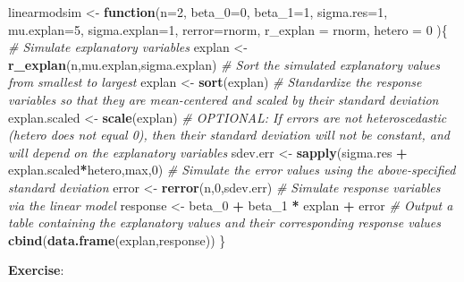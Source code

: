 \documentclass[
]{book}
\newenvironment{Shaded}{\begin{snugshade}}{\end{snugshade}}
\newcommand{\CommentTok}[1]{\textcolor[rgb]{0.56,0.35,0.01}{\textit{#1}}}
\newcommand{\ControlFlowTok}[1]{\textcolor[rgb]{0.13,0.29,0.53}{\textbf{#1}}}
\newcommand{\DataTypeTok}[1]{\textcolor[rgb]{0.13,0.29,0.53}{#1}}
\newcommand{\DecValTok}[1]{\textcolor[rgb]{0.00,0.00,0.81}{#1}}
\newcommand{\KeywordTok}[1]{\textcolor[rgb]{0.13,0.29,0.53}{\textbf{#1}}}
\newcommand{\NormalTok}[1]{#1}
\newcommand{\OperatorTok}[1]{\textcolor[rgb]{0.81,0.36,0.00}{\textbf{#1}}}
\newcommand{\StringTok}[1]{\textcolor[rgb]{0.31,0.60,0.02}{#1}}
\begin{document}
\begin{Shaded}
\begin{Highlighting}[]
\NormalTok{linearmodsim \textless{}{-}}\StringTok{ }\ControlFlowTok{function}\NormalTok{(}\DataTypeTok{n=}\DecValTok{2}\NormalTok{, }\DataTypeTok{beta\_0=}\DecValTok{0}\NormalTok{, }\DataTypeTok{beta\_1=}\DecValTok{1}\NormalTok{, }\DataTypeTok{sigma.res=}\DecValTok{1}\NormalTok{, }\DataTypeTok{mu.explan=}\DecValTok{5}\NormalTok{, }\DataTypeTok{sigma.explan=}\DecValTok{1}\NormalTok{, }\DataTypeTok{rerror=}\NormalTok{rnorm, }\DataTypeTok{r\_explan =}\NormalTok{ rnorm, }\DataTypeTok{hetero =} \DecValTok{0}\NormalTok{ )\{}
  \CommentTok{\# Simulate explanatory variables}
\NormalTok{  explan \textless{}{-}}\StringTok{ }\KeywordTok{r\_explan}\NormalTok{(n,mu.explan,sigma.explan)}
  \CommentTok{\# Sort the simulated explanatory values from smallest to largest}
\NormalTok{  explan \textless{}{-}}\StringTok{ }\KeywordTok{sort}\NormalTok{(explan)}
  \CommentTok{\# Standardize the response variables so that they are  mean{-}centered and scaled by their standard deviation}
\NormalTok{  explan.scaled \textless{}{-}}\StringTok{ }\KeywordTok{scale}\NormalTok{(explan)}
  \CommentTok{\# OPTIONAL: If errors are not heteroscedastic (hetero does not equal 0), then their standard deviation will not be constant, and will depend on the explanatory variables }
\NormalTok{  sdev.err \textless{}{-}}\StringTok{ }\KeywordTok{sapply}\NormalTok{(sigma.res }\OperatorTok{+}\StringTok{ }\NormalTok{explan.scaled}\OperatorTok{*}\NormalTok{hetero,max,}\DecValTok{0}\NormalTok{)}
  \CommentTok{\# Simulate the error values using the above{-}specified standard deviation}
\NormalTok{  error \textless{}{-}}\StringTok{ }\KeywordTok{rerror}\NormalTok{(n,}\DecValTok{0}\NormalTok{,sdev.err)}
  \CommentTok{\# Simulate response variables via the linear model}
\NormalTok{  response \textless{}{-}}\StringTok{ }\NormalTok{beta\_}\DecValTok{0} \OperatorTok{+}\StringTok{ }\NormalTok{beta\_}\DecValTok{1} \OperatorTok{*}\StringTok{ }\NormalTok{explan }\OperatorTok{+}\StringTok{ }\NormalTok{error}
  \CommentTok{\# Output a table containing the explanatory values and their corresponding response values}
  \KeywordTok{cbind}\NormalTok{(}\KeywordTok{data.frame}\NormalTok{(explan,response))}
\NormalTok{\}}
\end{Highlighting}
\end{Shaded}

\textbf{Exercise}:
\end{document}
